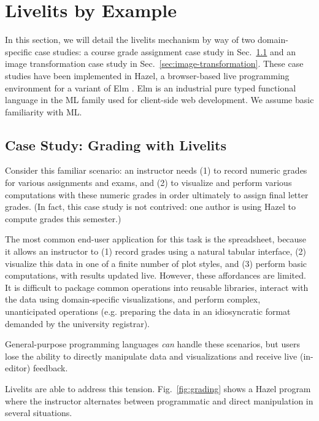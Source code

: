 \section{Livelits by Example}\label{sec:case-studies}


In this section, we will detail the livelits mechanism by way of
two domain-specific case studies:
a course grade assignment case study in Sec.~\ref{sec:live-grading}
and an image transformation case study in Sec.~\ref{sec:image-transformation}.
These case studies have been implemented
in Hazel, a browser-based live programming environment for a 
variant of Elm \cite{Elm}.
Elm is an industrial pure typed functional language in the
ML family used for client-side web development.
We assume basic familiarity with ML.

\subsection{Case Study: Grading with Livelits}\label{sec:live-grading}
Consider this familiar scenario: an instructor needs
(1) to record numeric grades for various assignments and exams, and
(2) to visualize and perform various computations with these numeric grades
in order ultimately to assign final letter grades.
(In fact, this case study is not contrived: one author is using Hazel to compute grades this semester.)

The most common end-user application for this task is the spreadsheet, because
it allows an instructor to (1) record grades using a natural tabular interface,
(2) visualize this data in one of a finite number of plot styles,
and (3) perform basic computations,
with results updated live.
However, these affordances are limited.
It is difficult to package common operations
into reusable libraries, interact with the data using domain-specific visualizations,
and perform complex, unanticipated operations
(e.g. preparing the data in an idiosyncratic format demanded by the university registrar).

General-purpose programming languages
\emph{can} handle these scenarios, but users
lose the ability to 
directly manipulate data and visualizations
and receive live (in-editor) feedback.

Livelits are able to address this tension.
Fig.~\ref{fig:grading} shows a Hazel program where
the instructor alternates between programmatic and direct manipulation in several situations.

